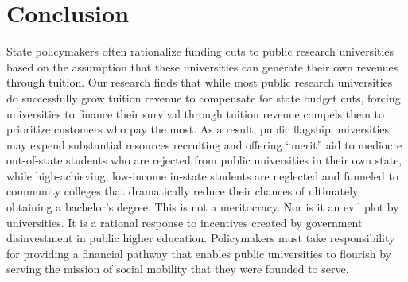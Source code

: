 \documentclass{article}
\begin{document}
\section*{Conclusion}

State policymakers often rationalize funding cuts to public research universities based on the assumption that these universities can generate their own revenues through tuition. Our research finds that while most public research universities do successfully grow tuition revenue to compensate for state budget cuts, forcing universities to finance their survival through tuition revenue compels them to prioritize customers who pay the most. As a result, public flagship universities may expend substantial resources recruiting and offering ``merit'' aid to mediocre out-of-state students who are rejected from public universities in their own state, while high-achieving, low-income in-state students are neglected and funneled to community colleges that dramatically reduce their chances of ultimately obtaining a bachelor's degree. This is not a meritocracy. Nor is it an evil plot by universities. It is a rational response to incentives created by government disinvestment in public higher education.  Policymakers must take responsibility for providing a financial pathway that enables public universities to flourish by serving the mission of social mobility that they were founded to serve.

\clearpage


\def\bibfont{\small}

\expandafter\def\expandafter\UrlBreaks\expandafter{\UrlBreaks%
  \do\a\do\b\do\c\do\d\do\e\do\f\do\g\do\h\do\i\do\j%
  \do\k\do\l\do\m\do\n\do\o\do\p\do\q\do\r\do\s\do\t%
  \do\u\do\v\do\w\do\x\do\y\do\z\do\A\do\B\do\C\do\D%
  \do\E\do\F\do\G\do\H\do\I\do\J\do\K\do\L\do\M\do\N%
  \do\O\do\P\do\Q\do\R\do\S\do\T\do\U\do\V\do\W\do\X%
  \do\Y\do\Z}

\begingroup
\raggedright

\endgroup
\end{document}
